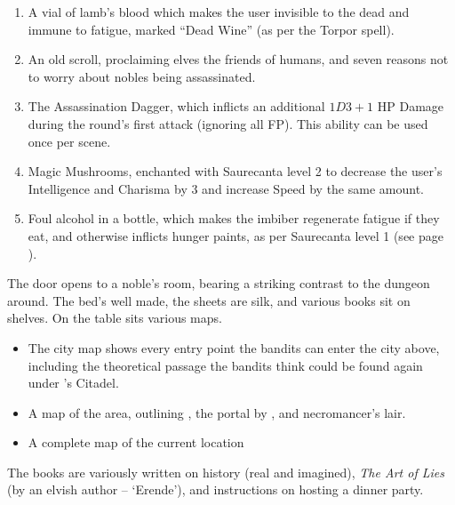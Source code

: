 \begin{multicols}{2}
\begin{enumerate}
  \item
  A vial of lamb's blood which makes the user invisible to the dead and immune to fatigue, marked ``Dead Wine'' (as per the Torpor spell).
  \item
  An old scroll, proclaiming elves the friends of humans, and seven reasons not to worry about nobles being assassinated.
  \item
  The Assassination Dagger, which inflicts an additional $1D3+1$ HP Damage during the round's first attack (ignoring all FP).
  This ability can be used once per scene.
  \item
  Magic Mushrooms, enchanted with Saurecanta level 2 to decrease the user's Intelligence and Charisma by 3 and increase Speed by the same amount.
  \item
  Foul alcohol in a bottle, which makes the imbiber regenerate fatigue if they eat, and otherwise inflicts hunger paints, as per Saurecanta level 1 (see page \pageref{saurecantaone}).
\end{enumerate}

\label{sewerKingRoom}

\begin{boxtext}
  The door opens to a noble's room, bearing a striking contrast to the dungeon around.  The bed's well made, the sheets are silk, and various books sit on shelves.  On the table sits various maps.
\end{boxtext}

\begin{itemize}

  \item
  The city map shows every entry point the bandits can enter the city above, including the theoretical passage the bandits think could be found again under 's Citadel.

  \item
  A map of the area, outlining , the portal by , and \gls{necromancer}'s lair.

  \item
  A complete map of the current location

\end{itemize}

The books are variously written on history (real and imagined), \textit{The Art of Lies} (by an elvish author -- `Erende'), and instructions on hosting a dinner party.



\end{multicols}
